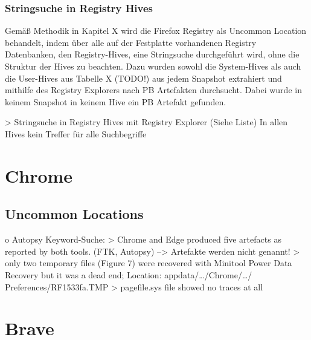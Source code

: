 \subsubsection*{Stringsuche in Registry Hives}

		Gemäß Methodik in Kapitel X wird die Firefox Registry als Uncommon Location behandelt, indem über alle auf der Festplatte vorhandenen Registry Datenbanken, den Registry-Hives, eine Stringsuche durchgeführt wird, ohne die Struktur der Hives zu beachten. 
		Dazu wurden sowohl die System-Hives als auch die User-Hives aus Tabelle X (TODO!) aus jedem Snapshot extrahiert und mithilfe des Registry Explorers nach PB Artefakten durchsucht.
		Dabei wurde in keinem Snapshot in keinem Hive ein PB Artefakt gefunden.
			
		> Stringsuche in Registry Hives mit Registry Explorer (Siehe Liste)
		In allen Hives kein Treffer für alle Suchbegriffe





\section{Chrome}

\subsection*{Uncommon Locations}

o Autopsy Keyword-Suche: 
	> Chrome and Edge produced five artefacts as reported by both tools. (FTK, Autopsy) \cite{Gabet.2018}
		--> Artefakte werden nicht genannt!
	> only two temporary files (Figure 7) were recovered with Minitool Power Data Recovery but it was a dead end; Location: appdata/…/Chrome/…/ Preferences/RF1533fa.TMP \cite{Fayyad.2021}
	> pagefile.sys file showed no traces at all \cite{Said.2011}
	

\section{Brave}